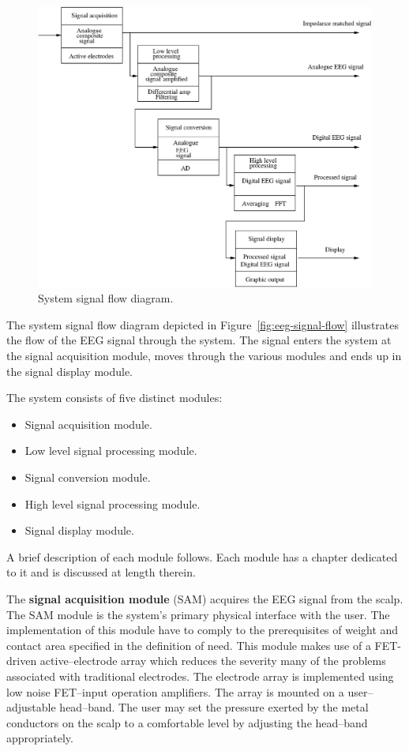 \begin{figure}[htbp]
\begin{center}
        \includegraphics[width=\textwidth]{eeg-signal-flow.eps}
        \caption{System signal flow diagram.}
        \label{fig:eeg-signal-flow}
\end{center}
\end{figure}

The system signal flow diagram depicted in
Figure~\vref{fig:eeg-signal-flow} illustrates the flow of the EEG
signal through the system. The signal enters the system at the signal
acquisition module, moves through the various modules and ends up in
the signal display module.

The system consists of five distinct modules:

\begin{itemize}
	\item{Signal acquisition module. }
	\item{Low level signal processing module.}
	\item{Signal conversion module.}
	\item{High level signal processing module.} 
	\item{Signal display module.}
\end{itemize}

A brief description of each module follows. Each module has a chapter
dedicated to it and is discussed at length therein.


The \textbf{signal acquisition module} (SAM) acquires the EEG signal
from the scalp. The SAM module is the system's primary physical
interface with the user. The implementation of this module have to
comply to the prerequisites of weight and contact area specified in
the definition of need. This module makes use of a FET-driven
active--electrode array which reduces the severity many of the
problems associated with traditional electrodes. The electrode array
is implemented using low noise FET--input operation amplifiers. The
array is mounted on a user--adjustable head--band. The user may set
the pressure exerted by the metal conductors on the scalp to a
comfortable level by adjusting the head--band appropriately.


